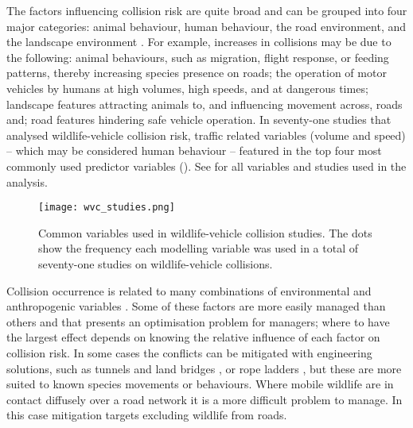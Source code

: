 The factors influencing collision risk are quite broad and can be grouped into four major categories: animal behaviour, human behaviour, the road environment, and the landscape environment \citep{form03}. For example, increases in collisions may be due to the following: animal behaviours, such as migration, flight response, or feeding patterns, thereby increasing species presence on roads; the operation of motor vehicles by humans at high volumes, high speeds, and at dangerous times; landscape features attracting animals to, and influencing movement across, roads and; road features hindering safe vehicle operation. In seventy-one studies that analysed wildlife-vehicle collision risk, traffic related variables (volume and speed) -- which may be considered human behaviour -- featured in the top four most commonly used predictor variables (). See  for all variables and studies used in the analysis.

\begin{figure*}[!t]
  \centering
  \texttt{[image: wvc\_studies.png]}
  \caption[Variables used in wildlife-vehicle collision studies]{Common variables used in wildlife-vehicle collision studies. The dots show the frequency each modelling variable was used in a total of seventy-one studies on wildlife-vehicle collisions.}
  \label{wvc_studies}
\end{figure*}


Collision occurrence is related to many combinations of environmental and anthropogenic variables \citep{barn07}. Some of these factors are more easily managed than others and that presents an optimisation problem for managers; where to have the largest effect depends on knowing the relative influence of each factor on collision risk. In some cases the conflicts can be mitigated with engineering solutions, such as tunnels and land bridges \citep{bond08}, or rope ladders \citep{soan13}, but these are more suited to known species movements or behaviours. Where mobile wildlife are in contact diffusely over a road network it is a more difficult problem to manage. In this case mitigation targets excluding wildlife from roads.

